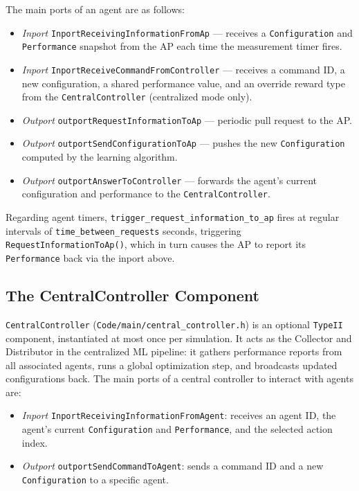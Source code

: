\documentclass[11pt,a4paper]{article}
\begin{document}
The main ports of an agent are as follows:
\begin{itemize}
    \item \textit{Inport} \texttt{InportReceivingInformationFromAp} --- receives a \texttt{Configuration} and \texttt{Performance} snapshot from the AP each time the measurement timer fires.
    \item \textit{Inport} \texttt{InportReceiveCommandFromController} --- receives a command ID, a new configuration, a shared performance value, and an override reward type from the \texttt{CentralController} (centralized mode only).
    \item \textit{Outport} \texttt{outportRequestInformationToAp} --- periodic pull request to the AP.
    \item \textit{Outport} \texttt{outportSendConfigurationToAp} --- pushes the new \texttt{Configuration} computed by the learning algorithm.
    \item \textit{Outport} \texttt{outportAnswerToController} --- forwards the agent's current configuration and performance to the \texttt{CentralController}.
\end{itemize}

Regarding agent timers, \texttt{trigger\_request\_information\_to\_ap} fires at regular intervals of \texttt{time\_between\_requests} seconds, triggering \texttt{RequestInformationToAp()}, which in turn causes the AP to report its \texttt{Performance} back via the inport above.


\subsection{The CentralController Component}
\label{sec:cc}

\texttt{CentralController} (\texttt{Code/main/central\_controller.h}) is an optional \texttt{TypeII} component, instantiated at most once per simulation.  It acts as the Collector and Distributor in the centralized ML pipeline: it gathers performance reports from all associated agents, runs a global optimization step, and broadcasts updated configurations back. The main ports of a central controller to interact with agents are:
\begin{itemize}
    \item \textit{Inport} \texttt{InportReceivingInformationFromAgent}: receives an agent ID, the agent's current \texttt{Configuration} and \texttt{Performance}, and the selected action index.
    \item \textit{Outport} \texttt{outportSendCommandToAgent}: sends a command ID and a new \texttt{Configuration} to a specific agent.
\end{itemize}
\end{document}
